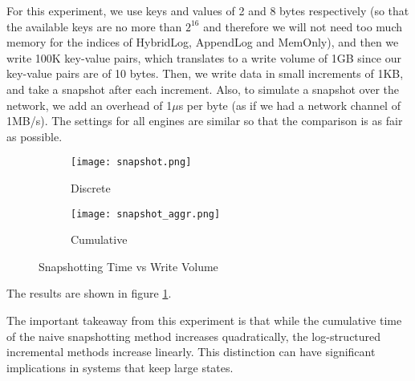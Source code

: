 For this experiment, we use keys and values of 2 and 8 bytes respectively (so that the available keys are no more than $2^{16}$ and therefore we will not need too much memory for the indices of HybridLog, AppendLog and MemOnly), and then we write 100K key-value pairs, which translates to a write volume of 1GB since our key-value pairs are of 10 bytes. Then, we write data in small increments of 1KB, and take a snapshot after each increment. Also, to simulate a snapshot over the network, we add an overhead of 1$\mu$s per byte (as if we had a network channel of 1MB/s). The settings for all engines are similar so that the comparison is as fair as possible.

\begin{figure}[H]
    \begin{subfigure}{.5\textwidth}
        \centering
        \texttt{[image: snapshot.png]}
        \caption{Discrete}
    \end{subfigure}
    \begin{subfigure}{.5\textwidth}
        \centering
        \texttt{[image: snapshot\_aggr.png]}
        \caption{Cumulative}
    \end{subfigure}
    \caption{Snapshotting Time vs Write Volume}
    \label{fig:incremental-snapshots}
\end{figure}

The results are shown in figure \ref{fig:incremental-snapshots}.

The important takeaway from this experiment is that while the cumulative time of the naive snapshotting method increases quadratically, the log-structured incremental methods increase linearly. This distinction can have significant implications in systems that keep large states.


